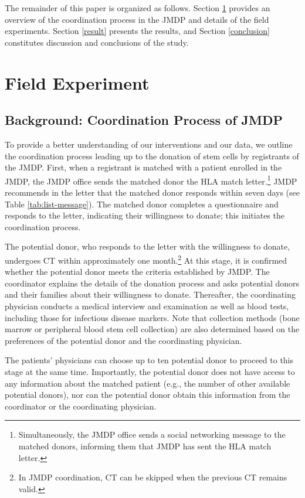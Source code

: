 \documentclass[12pt, a4paper]{article}
\begin{document}
The remainder of this paper is organized as follows. Section \ref{experiment} provides an overview of the coordination process in the JMDP and details of the field experiments. Section \ref{result} presents the results, and Section \ref{conclusion} constitutes discussion and conclusions of the study.

\hypertarget{experiment}{%
\section{Field Experiment}\label{experiment}}

\hypertarget{background}{%
\subsection{Background: Coordination Process of JMDP}\label{background}}

To provide a better understanding of our interventions and our data, we outline the coordination process leading up to the donation of stem cells by registrants of the JMDP. First, when a registrant is matched with a patient enrolled in the JMDP, the JMDP office sends the matched donor the HLA match letter.\footnote{Simultaneously, the JMDP office sends a social networking message to the matched donors, informing them that JMDP has sent the HLA match letter.} JMDP recommends in the letter that the matched donor responds within seven days (see Table \ref{tab:list-message}). The matched donor completes a questionnaire and responds to the letter, indicating their willingness to donate; this initiates the coordination process.

The potential donor, who responds to the letter with the willingness to donate, undergoes CT within approximately one month.\footnote{In JMDP coordination, CT can be skipped when the previous CT remains valid.} At this stage, it is confirmed whether the potential donor meets the criteria established by JMDP. The coordinator explains the details of the donation process and asks potential donors and their families about their willingness to donate. Thereafter, the coordinating physician conducts a medical interview and examination as well as blood tests, including those for infectious disease markers. Note that collection methods (bone marrow or peripheral blood stem cell collection) are also determined based on the preferences of the potential donor and the coordinating physician.

The patients' physicians can choose up to ten potential donor to proceed to this stage at the same time. Importantly, the potential donor does not have access to any information about the matched patient (e.g., the number of other available potential donors), nor can the potential donor obtain this information from the coordinator or the coordinating physician.
\end{document}
